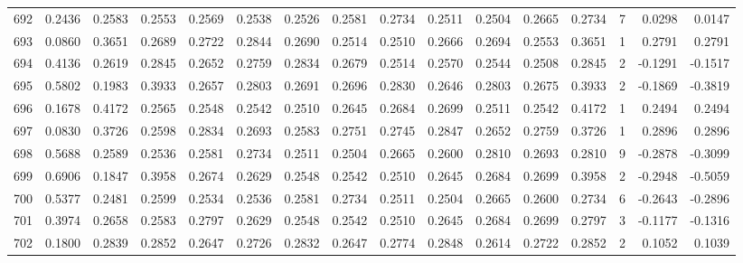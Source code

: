 \begin{tabular}{lrrrrrrrrrrrrrrr}
692 &      0.2436 &  0.2583 &  0.2553 &  0.2569 &  0.2538 &  0.2526 &  0.2581 &  0.2734 &  0.2511 &  0.2504 &   0.2665 &     0.2734 &      7 &                    0.0298 &                     0.0147 \\
693 &      0.0860 &  0.3651 &  0.2689 &  0.2722 &  0.2844 &  0.2690 &  0.2514 &  0.2510 &  0.2666 &  0.2694 &   0.2553 &     0.3651 &      1 &                    0.2791 &                     0.2791 \\
694 &      0.4136 &  0.2619 &  0.2845 &  0.2652 &  0.2759 &  0.2834 &  0.2679 &  0.2514 &  0.2570 &  0.2544 &   0.2508 &     0.2845 &      2 &                   -0.1291 &                    -0.1517 \\
695 &      0.5802 &  0.1983 &  0.3933 &  0.2657 &  0.2803 &  0.2691 &  0.2696 &  0.2830 &  0.2646 &  0.2803 &   0.2675 &     0.3933 &      2 &                   -0.1869 &                    -0.3819 \\
696 &      0.1678 &  0.4172 &  0.2565 &  0.2548 &  0.2542 &  0.2510 &  0.2645 &  0.2684 &  0.2699 &  0.2511 &   0.2542 &     0.4172 &      1 &                    0.2494 &                     0.2494 \\
697 &      0.0830 &  0.3726 &  0.2598 &  0.2834 &  0.2693 &  0.2583 &  0.2751 &  0.2745 &  0.2847 &  0.2652 &   0.2759 &     0.3726 &      1 &                    0.2896 &                     0.2896 \\
698 &      0.5688 &  0.2589 &  0.2536 &  0.2581 &  0.2734 &  0.2511 &  0.2504 &  0.2665 &  0.2600 &  0.2810 &   0.2693 &     0.2810 &      9 &                   -0.2878 &                    -0.3099 \\
699 &      0.6906 &  0.1847 &  0.3958 &  0.2674 &  0.2629 &  0.2548 &  0.2542 &  0.2510 &  0.2645 &  0.2684 &   0.2699 &     0.3958 &      2 &                   -0.2948 &                    -0.5059 \\
700 &      0.5377 &  0.2481 &  0.2599 &  0.2534 &  0.2536 &  0.2581 &  0.2734 &  0.2511 &  0.2504 &  0.2665 &   0.2600 &     0.2734 &      6 &                   -0.2643 &                    -0.2896 \\
701 &      0.3974 &  0.2658 &  0.2583 &  0.2797 &  0.2629 &  0.2548 &  0.2542 &  0.2510 &  0.2645 &  0.2684 &   0.2699 &     0.2797 &      3 &                   -0.1177 &                    -0.1316 \\
702 &      0.1800 &  0.2839 &  0.2852 &  0.2647 &  0.2726 &  0.2832 &  0.2647 &  0.2774 &  0.2848 &  0.2614 &   0.2722 &     0.2852 &      2 &                    0.1052 &                     0.1039 \\

\end{tabular}
